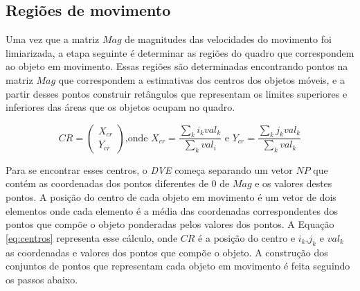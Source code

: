\subsection{Regiões de movimento}\label{sec:sub:regioesmovimento}

Uma vez que a matriz $Mag$ de magnitudes das velocidades do movimento foi limiarizada, a etapa seguinte é determinar as regiões do quadro que correspondem ao objeto em movimento. Essas regiões são determinadas encontrando pontos na matriz $Mag$ que correspondem a estimativas dos centros dos objetos móveis, e a partir desses pontos construir retângulos que representam os limites superiores e inferiores das áreas que os objetos ocupam no quadro.

\begin{equation}
CR=\begin{pmatrix}
X_{cr}\\Y_{cr}
\end{pmatrix}
\text{,onde } 
X_{cr} = \frac{\sum_k i_kval_k}{\sum_kval_i}
\text{ e }
Y_{cr} = \frac{\sum_k j_kval_k}{\sum_kval_k}
\label{eq:centros}
\end{equation}

Para se encontrar esses centros, o \textit{DVE} começa separando um vetor $NP$ que contém as coordenadas dos pontos diferentes de $0$ de $Mag$ e os valores destes pontos. A posição do centro de cada objeto em movimento é um vetor de dois elementos onde cada elemento é a média das coordenadas correspondentes dos pontos que compõe o objeto ponderadas pelos valores dos pontos. A Equação \ref{eq:centros} representa esse cálculo, onde $CR$ é a posição do centro e $i_k$,$j_k$ e $val_k$ as coordenadas e valores dos pontos que compõe o objeto. A construção dos conjuntos de pontos que representam cada objeto em movimento é feita seguindo os passos abaixo.

